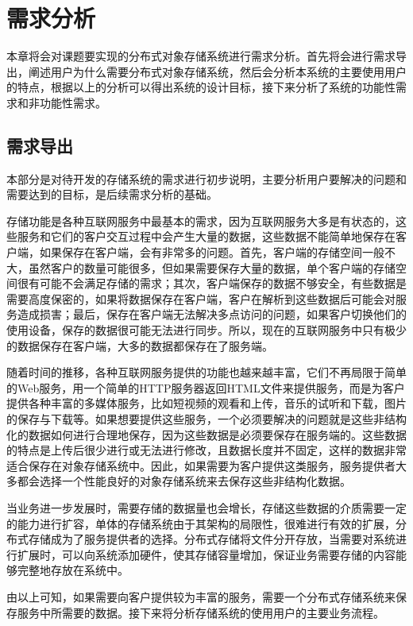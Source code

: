 
\chapter{需求分析}
本章将会对课题要实现的分布式对象存储系统进行需求分析。首先将会进行需求导出，阐述用户为什么需要分布式对象存储系统，然后会分析本系统的主要使用用户的特点，根据以上的分析可以得出系统的设计目标，接下来分析了系统的功能性需求和非功能性需求。

\section{需求导出}%
本部分是对待开发的存储系统的需求进行初步说明，主要分析用户要解决的问题和需要达到的目标，是后续需求分析的基础。

存储功能是各种互联网服务中最基本的需求，因为互联网服务大多是有状态的，这些服务和它们的客户交互过程中会产生大量的数据，这些数据不能简单地保存在客户端，如果保存在客户端，会有非常多的问题。首先，客户端的存储空间一般不大，虽然客户的数量可能很多，但如果需要保存大量的数据，单个客户端的存储空间很有可能不会满足存储的需求；其次，客户端保存的数据不够安全，有些数据是需要高度保密的，如果将数据保存在客户端，客户在解析到这些数据后可能会对服务造成损害；最后，保存在客户端无法解决多点访问的问题，如果客户切换他们的使用设备，保存的数据很可能无法进行同步。所以，现在的互联网服务中只有极少的数据保存在客户端，大多的数据都保存在了服务端。

随着时间的推移，各种互联网服务提供的功能也越来越丰富，它们不再局限于简单的Web服务，用一个简单的HTTP服务器返回HTML文件来提供服务，而是为客户提供各种丰富的多媒体服务，比如短视频的观看和上传，音乐的试听和下载，图片的保存与下载等。如果想要提供这些服务，一个必须要解决的问题就是这些非结构化的数据如何进行合理地保存，因为这些数据是必须要保存在服务端的。这些数据的特点是上传后很少进行或无法进行修改，且数据长度并不固定，这样的数据非常适合保存在对象存储系统中。因此，如果需要为客户提供这类服务，服务提供者大多都会选择一个性能良好的对象存储系统来去保存这些非结构化数据。

当业务进一步发展时，需要存储的数据量也会增长，存储这些数据的介质需要一定的能力进行扩容，单体的存储系统由于其架构的局限性，很难进行有效的扩展，分布式存储成为了服务提供者的选择。分布式存储将文件分开存放，当需要对系统进行扩展时，可以向系统添加硬件，使其存储容量增加，保证业务需要存储的内容能够完整地存放在系统中。

由以上可知，如果需要向客户提供较为丰富的服务，需要一个分布式存储系统来保存服务中所需要的数据。接下来将分析存储系统的使用用户的主要业务流程。

